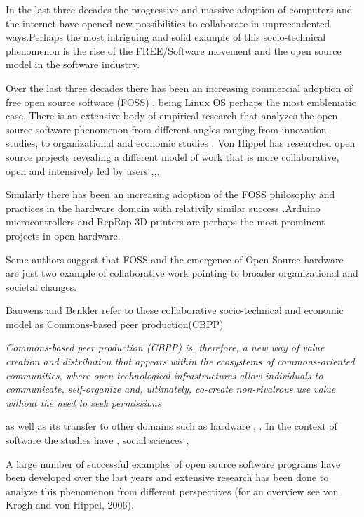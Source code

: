 \documentclass{ICED-Paper}%
\begin{document}
In the last three decades the progressive and massive adoption of computers and the internet have opened new possibilities to collaborate in unprecendented ways.Perhaps the most intriguing and solid example of this socio-technical phenomenon is the rise of the FREE/Software movement and the open source model in the software industry.

Over the last three decades there has been an increasing commercial adoption of free open source software (FOSS) \cite{Adoption}, being Linux OS perhaps the most emblematic case. There is an extensive body of empirical research that analyzes the open source software phenomenon from different angles ranging from innovation studies\cite{HowItWorks}, to organizational \cite{ActivityTheoryOpenSource} and economic studies \cite{Economics}. Von Hippel has researched open source projects revealing a different model of work that is more collaborative, open and intensively led by users \cite{HowItWorks},\cite{hippel_4},\cite{hippel_2}.

Similarly there has been an increasing adoption of the FOSS philosophy and practices in the hardware domain with relativily similar success \cite{OSTangibleGoods}.Arduino microcontrollers and RepRap 3D printers are perhaps the most prominent projects in open hardware.

Some authors suggest that FOSS and the emergence of Open Source hardware are just two example of collaborative work pointing to broader organizational and societal changes.

Bauwens and Benkler refer to these collaborative socio-technical and economic model as Commons-based peer production(CBPP) \cite{}

\emph{Commons-based peer production (CBPP) is, therefore, a new way of value creation and distribution that appears within the ecosystems
of commons-oriented communities, where open technological infrastructures allow individuals to communicate, self-organize and,
ultimately, co-create non-rivalrous use value without the need to seek permissions}



as well as its transfer to other domains such as hardware \cite{OSTangible}, \cite{OSTangibleGoods}.
In the context of software the studies have \cite{HowItWorks}, social sciences \cite{Economics},

A large number of successful examples of open source software programs have been developed over the last years and extensive research has been done to analyze this phenomenon from different perspectives (for an overview see von Krogh and von Hippel, 2006).
\end{document}
